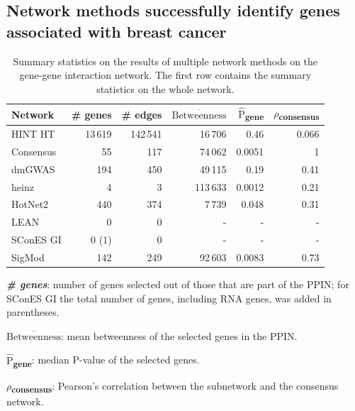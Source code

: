 \documentclass[twocolumn, 11pt, draft]{article}
\newcommand{\mean}[1]{$\overline{\mbox{#1}}$}
\newcommand{\median}[1]{$\hat{\mbox{#1}}$}
\begin{document}
\subsection{Network methods successfully identify genes associated with breast cancer}
\label{results:separate_networks}
\begin{table}[htbp]
  \centering
  \begin{threeparttable}
\caption{\label{tab:gene_solutions}
Summary statistics on the results of multiple network methods on the gene-gene interaction network. The first row contains the summary statistics on the whole network.}
\centering
\begin{tabular}{lrrrrr}
Network & \# genes & \# edges & \mean{Betweenness} & \median{P}\textsubscript{gene} & \(\rho\)\textsubscript{consensus}\\
\hline
HINT HT & 13\,619 & 142\,541 & 16\,706 & 0.46 & 0.066\\
\hline
Consensus & 55 & 117 & 74\,062 & 0.0051 & 1\\
dmGWAS & 194 & 450 & 49\,115 & 0.19 & 0.41\\
heinz & 4 & 3 & 113\,633 & 0.0012 & 0.21\\
HotNet2 & 440 & 374 & 7\,739 & 0.048 & 0.31\\
LEAN & 0 & 0 & - & - & -\\
SConES GI & 0 (1) & 0 & - & - & -\\
SigMod & 142 & 249 & 92\,603 & 0.0083 & 0.73\\
\end{tabular}
\begin{tablenotes}
  \item \textbf{\emph{\# genes}}: number of genes selected out of those that are part of the PPIN; for SConES GI the total number of genes, including RNA genes, was added in parentheses.
  \item \textbf{\mean{Betweenness}}: mean betweenness of the selected genes in the PPIN.
  \item \textbf{\median{P}\textsubscript{gene}}: median P-value of the selected genes.
  \item \textbf{\(\rho\)\textsubscript{consensus}}: Pearson's correlation between the subnetwork and the consensus network.
\end{tablenotes}
\end{threeparttable}
\end{table}
\end{document}
